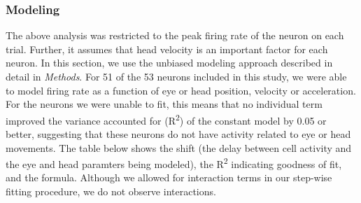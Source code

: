 \documentclass[]{article}
\begin{document}
\subsubsection{Modeling}\label{modeling-1}

The above analysis was restricted to the peak firing rate of the neuron
on each trial. Further, it assumes that head velocity is an important
factor for each neuron. In this section, we use the unbiased modeling
approach described in detail in \emph{Methods}. For 51 of the 53 neurons
included in this study, we were able to model firing rate as a function
of eye or head position, velocity or acceleration. For the neurons we
were unable to fit, this means that no individual term improved the
variance accounted for (R\textsuperscript{2}) of the constant model by
0.05 or better, suggesting that these neurons do not have activity
related to eye or head movements. The table below shows the shift (the
delay between cell activity and the eye and head paramters being
modeled), the R\textsuperscript{2} indicating goodness of fit, and the
formula. Although we allowed for interaction terms in our step-wise
fitting procedure, we do not observe interactions.
\end{document}
